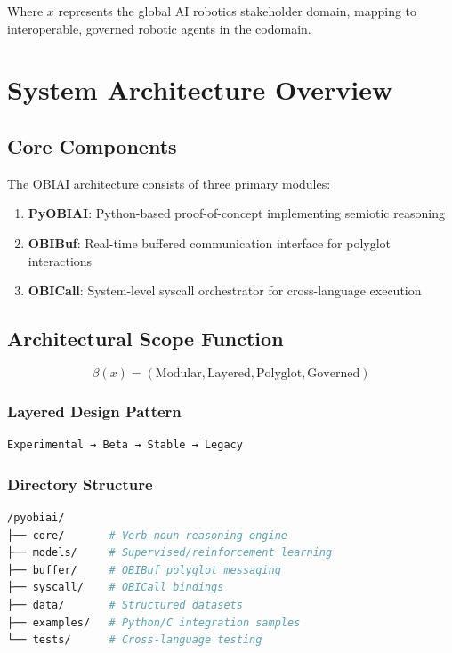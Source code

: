 \documentclass[12pt,a4paper]{article}
\begin{document}
Where $x$ represents the global AI robotics stakeholder domain, mapping to interoperable, governed robotic agents in the codomain.

\section{System Architecture Overview}

\subsection{Core Components}
The OBIAI architecture consists of three primary modules:

\begin{enumerate}
    \item \textbf{PyOBIAI}: Python-based proof-of-concept implementing semiotic reasoning
    \item \textbf{OBIBuf}: Real-time buffered communication interface for polyglot interactions
    \item \textbf{OBICall}: System-level syscall orchestrator for cross-language execution
\end{enumerate}

\subsection{Architectural Scope Function}
\begin{equation}
\beta(x) = (\text{Modular}, \text{Layered}, \text{Polyglot}, \text{Governed})
\end{equation}

\subsubsection{Layered Design Pattern}
\begin{verbatim}
Experimental → Beta → Stable → Legacy
\end{verbatim}

\subsubsection{Directory Structure}
\begin{lstlisting}[language=bash]
/pyobiai/
├── core/       # Verb-noun reasoning engine
├── models/     # Supervised/reinforcement learning
├── buffer/     # OBIBuf polyglot messaging
├── syscall/    # OBICall bindings
├── data/       # Structured datasets
├── examples/   # Python/C integration samples
└── tests/      # Cross-language testing
\end{lstlisting}
\end{document}

